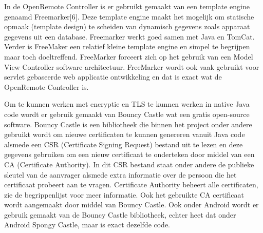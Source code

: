 \documentclass[]{article}
\begin{document}
In de OpenRemote Controller is er gebruikt gemaakt van een template engine
genaamd Freemarker[6]. Deze template engine maakt het mogelijk om statische
opmaak (template design) te scheiden van dynamisch gegevens zoals apparaat
gegevens uit een database. Freemarker werkt goed samen met Java en TomCat.
Verder is FreeMaker een relatief kleine template engine en simpel te
begrijpen maar toch doeltreffend. FreeMarker forceert zich op het gebruik
van een Model View Controller software architectuur. FreeMarker wordt ook
vaak gebruikt voor servlet gebaseerde web applicatie ontwikkeling en dat is
exact wat de OpenRemote Controller is.

Om te kunnen werken met encryptie en TLS te kunnen werken in native Java code
wordt er gebruik gemaakt van Bouncy Castle wat een gratis open-source software.
Bouncy Castle is een bibliotheek die binnen het project onder andere gebruikt
wordt om nieuwe certificaten te kunnen genereren vanuit Java code alsmede een CSR
(Certificate Signing Request) bestand uit te lezen en deze gegevens gebruiken om een nieuw certificaat te
onderteken door middel van een CA (Certificate Authority). In dit CSR bestand
staat onder andere de publieke sleutel van de aanvrager alsmede extra informatie
over de persoon die het certificaat probeert aan te vragen. Certificate
Authority beheert alle certificaten, zie de begrippenlijst voor meer informatie. Ook het gebruikte CA certificaat wordt
aangemaakt door middel van Bouncy Castle. Ook onder Android wordt er gebruik
gemaakt van de Bouncy Castle bibliotheek, echter heet dat onder Android Spongy
Castle, maar is exact dezelfde code.
\end{document}
